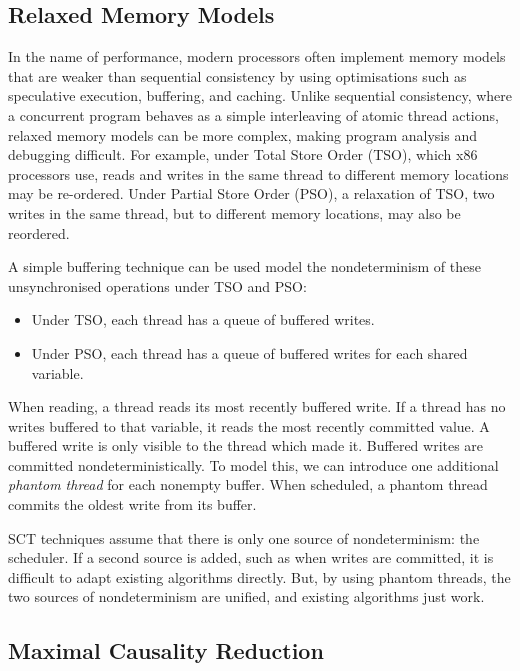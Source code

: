 \subsection{Relaxed Memory Models}

In the name of performance, modern processors often implement memory
models that are weaker than sequential consistency\cite{lamport1979}
by using optimisations such as speculative execution, buffering, and
caching.  Unlike sequential consistency, where a concurrent program
behaves as a simple interleaving of atomic thread actions, relaxed
memory models can be more complex, making program analysis and
debugging difficult.  For example, under Total Store Order (TSO),
which x86 processors use\cite{owens2009}, reads and writes in the same
thread to different memory locations may be re-ordered.  Under Partial
Store Order (PSO), a relaxation of TSO\cite{sparc}, two writes in the
same thread, but to different memory locations, may also be reordered.

A simple buffering technique can be used model the nondeterminism of
these unsynchronised operations under TSO and PSO\cite{zhang2015}:

\begin{itemize}
\item Under TSO, each thread has a queue of buffered writes.
\item Under PSO, each thread has a queue of buffered writes for each shared
variable.
\end{itemize}

When reading, a thread reads its most recently buffered write.  If a
thread has no writes buffered to that variable, it reads the most
recently committed value.  A buffered write is only visible to the
thread which made it.  Buffered writes are committed
nondeterministically.  To model this, we can introduce one additional
\emph{phantom thread} for each nonempty buffer.  When scheduled, a
phantom thread commits the oldest write from its buffer.

SCT techniques assume that there is only one source of nondeterminism:
the scheduler.  If a second source is added, such as when writes are
committed, it is difficult to adapt existing algorithms directly.
But, by using phantom threads, the two sources of nondeterminism are
unified, and existing algorithms just work\cite{zhang2015}.

\subsection{Maximal Causality Reduction}

